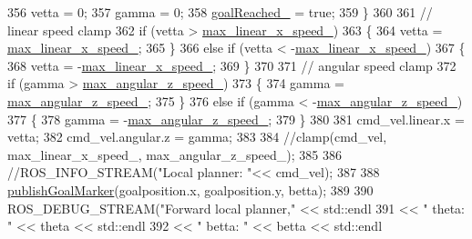 \begin{DoxyCode}
{356         vetta = 0;
357         gamma = 0;
358         \hyperlink{classcl__move__base__z_1_1forward__local__planner_1_1ForwardLocalPlanner_a9d51ad6f0eb364ebd830526280bdf4fc}{goalReached\_} = \textcolor{keyword}{true};
359     \}
360 
361     \textcolor{comment}{// linear speed clamp}
362     \textcolor{keywordflow}{if} (vetta > \hyperlink{classcl__move__base__z_1_1forward__local__planner_1_1ForwardLocalPlanner_ab2e354dca208a2df60e905c9ee1fcd75}{max\_linear\_x\_speed\_})
363     \{
364         vetta = \hyperlink{classcl__move__base__z_1_1forward__local__planner_1_1ForwardLocalPlanner_ab2e354dca208a2df60e905c9ee1fcd75}{max\_linear\_x\_speed\_};
365     \}
366     \textcolor{keywordflow}{else} \textcolor{keywordflow}{if} (vetta < -\hyperlink{classcl__move__base__z_1_1forward__local__planner_1_1ForwardLocalPlanner_ab2e354dca208a2df60e905c9ee1fcd75}{max\_linear\_x\_speed\_})
367     \{
368         vetta = -\hyperlink{classcl__move__base__z_1_1forward__local__planner_1_1ForwardLocalPlanner_ab2e354dca208a2df60e905c9ee1fcd75}{max\_linear\_x\_speed\_};
369     \}
370 
371     \textcolor{comment}{// angular speed clamp}
372     \textcolor{keywordflow}{if} (gamma > \hyperlink{classcl__move__base__z_1_1forward__local__planner_1_1ForwardLocalPlanner_a198154e40443d46292d8eba1d81ad34f}{max\_angular\_z\_speed\_})
373     \{
374         gamma = \hyperlink{classcl__move__base__z_1_1forward__local__planner_1_1ForwardLocalPlanner_a198154e40443d46292d8eba1d81ad34f}{max\_angular\_z\_speed\_};
375     \}
376     \textcolor{keywordflow}{else} \textcolor{keywordflow}{if} (gamma < -\hyperlink{classcl__move__base__z_1_1forward__local__planner_1_1ForwardLocalPlanner_a198154e40443d46292d8eba1d81ad34f}{max\_angular\_z\_speed\_})
377     \{
378         gamma = -\hyperlink{classcl__move__base__z_1_1forward__local__planner_1_1ForwardLocalPlanner_a198154e40443d46292d8eba1d81ad34f}{max\_angular\_z\_speed\_};
379     \}
380 
381     cmd\_vel.linear.x = vetta;
382     cmd\_vel.angular.z = gamma;
383 
384     \textcolor{comment}{//clamp(cmd\_vel, max\_linear\_x\_speed\_, max\_angular\_z\_speed\_);}
385 
386     \textcolor{comment}{//ROS\_INFO\_STREAM("Local planner: "<< cmd\_vel);}
387 
388     \hyperlink{classcl__move__base__z_1_1forward__local__planner_1_1ForwardLocalPlanner_ae2ef5a1d00495eb7a6c22ec35ab8baf2}{publishGoalMarker}(goalposition.x, goalposition.y, betta);
389 
390     ROS\_DEBUG\_STREAM(\textcolor{stringliteral}{"Forward local planner,"} << std::endl
391                                               << \textcolor{stringliteral}{" theta: "} << theta << std::endl
392                                               << \textcolor{stringliteral}{" betta: "} << betta << std::endl
}
\end{DoxyCode}
